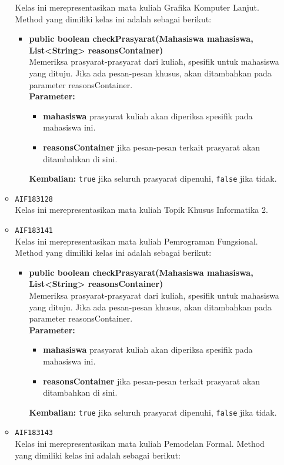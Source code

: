 \begin{enumerate}
\begin{itemize}
Kelas ini merepresentasikan mata kuliah Grafika Komputer Lanjut. Method yang dimiliki kelas ini adalah sebagai berikut: 
\begin{itemize}
\item \textbf{public boolean checkPrasyarat(Mahasiswa mahasiswa, List<String> reasonsContainer)}\\
Memeriksa prasyarat-prasyarat dari kuliah, spesifik untuk mahasiswa yang dituju. Jika ada pesan-pesan khusus, akan ditambahkan pada parameter reasonsContainer.\\
\textbf{Parameter:}
\begin{itemize}
\item \textbf{mahasiswa} prasyarat kuliah akan diperiksa spesifik pada mahasiswa ini.
\item \textbf{reasonsContainer} jika pesan-pesan terkait prasyarat akan ditambahkan di sini.
\end{itemize}
\textbf{Kembalian:} \texttt{true} jika seluruh prasyarat dipenuhi, \texttt{false} jika tidak.
\end{itemize}
\item \texttt{AIF183128} \\
Kelas ini merepresentasikan mata kuliah Topik Khusus Informatika 2.
\item \texttt{AIF183141} \\
Kelas ini merepresentasikan mata kuliah Pemrograman Fungsional. Method yang dimiliki kelas ini adalah sebagai berikut: 
\begin{itemize}
\item \textbf{public boolean checkPrasyarat(Mahasiswa mahasiswa, List<String> reasonsContainer)}\\
Memeriksa prasyarat-prasyarat dari kuliah, spesifik untuk mahasiswa yang dituju. Jika ada pesan-pesan khusus, akan ditambahkan pada parameter reasonsContainer.\\
\textbf{Parameter:}
\begin{itemize}
\item \textbf{mahasiswa} prasyarat kuliah akan diperiksa spesifik pada mahasiswa ini.
\item \textbf{reasonsContainer} jika pesan-pesan terkait prasyarat akan ditambahkan di sini.
\end{itemize}
\textbf{Kembalian:} \texttt{true} jika seluruh prasyarat dipenuhi, \texttt{false} jika tidak.
\end{itemize}
\item \texttt{AIF183143} \\
Kelas ini merepresentasikan mata kuliah Pemodelan Formal. Method yang dimiliki kelas ini adalah sebagai berikut: 

\end{itemize}
\end{enumerate}
